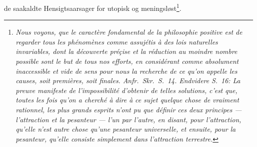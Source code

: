\documentclass[12pt]{article}
\begin{document}
de saakaldte Hensigtsaarsager for utopisk og meningsløst\footnote{%
\textit{Nous voyons, que le caractère fondamental de la philosophie positive
est de regarder tous les phénomènes comme assujétis à des \emph{lois} naturelles
invariables, dont la découverte préçise et la réduction au moindre nombre
possible sont le but de tous nos efforts, en considérant comme absolument
inaccessible et vide de sens pour nous la recherche de ce qu'on appelle les
\emph{causes}, soit premières, soit finales. Anfr.\ Skr.\ S.\ 14. Endvidere
S.\ 16: La preuve manifeste de l'impossibilité d'obtenir de telles solutions,
c'est que, toutes les fois qu'on a cherché à dire à ce sujet quelque chose de
vraiment rationnel, les plus grands esprits n'ont pu que définir ces deux
principes --- l'attraction et la pesanteur --- l'un par l'autre, en disant,
pour l'attraction, qu'elle n'est autre chose qu'une pesanteur universelle, et
ensuite, pour la pesanteur, qu'elle consiste simplement dans l'attraction
terrestre.}}.
\end{document}
